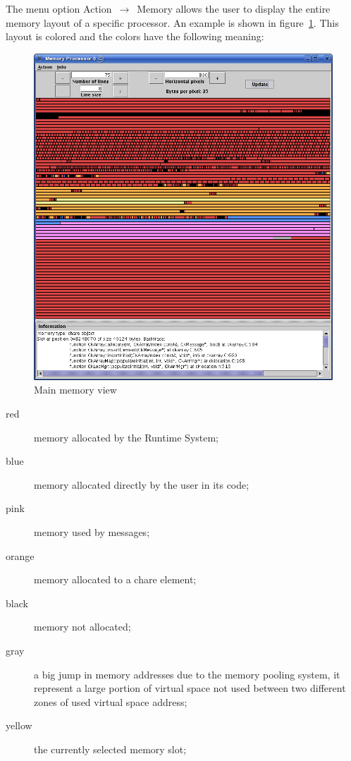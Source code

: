 The menu option Action~$\rightarrow$~Memory allows the user to display the
entire memory layout of a specific processor. An example is shown in
figure~\ref{fig:memory}. This layout is colored and the colors have the
following meaning:

\begin{figure}[ht!]
\centering
\includegraphics[scale=0.5]{figs/memoryView}
\caption{Main memory view}
\label{fig:memory}
\end{figure}

\begin{description}

\item[red] memory allocated by the \charmpp{} Runtime System;

\item[blue] memory allocated directly by the user in its code;

\item[pink] memory used by messages;

\item[orange] memory allocated to a chare element;

\item[black] memory not allocated;

\item[gray] a big jump in memory addresses due to the memory pooling system, it represent a large portion of virtual space not used between two different zones of used virtual space address;

\item[yellow] the currently selected memory slot;

\end{description}


